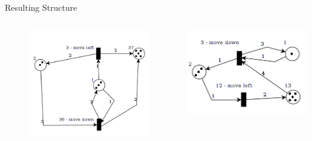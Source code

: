 \documentclass[12pt]{beamer}
\begin{document}
\begin{frame}{Resulting Structure}
\begin{columns}
\begin{column}{2in}
\begin{figure}
\includegraphics[scale=0.3]{PetriNet_2_1}
\end{figure}
\end{column}
\begin{column}{2in}
\includegraphics[scale=0.3]{PetriNet_2_2}
\end{column}

\end{columns}
\end{frame}
\end{document}
